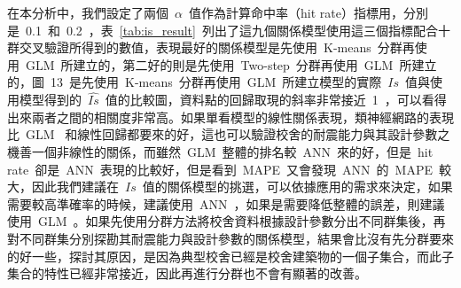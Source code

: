 



在本分析中，我們設定了兩個~$\alpha$~值作為計算命中率（hit rate）指標用，分別是~0.1~和~0.2~，表~\ref{tab:is_result}~列出了這九個關係模型使用這三個指標配合十群交叉驗證所得到的數值，表現最好的關係模型是先使用~K-means~分群再使用~GLM~所建立的，第二好的則是先使用~Two-step~分群再使用~GLM~所建立的，圖~13~是先使用~K-means~分群再使用~GLM~所建立模型的實際~$Is$~值與使用模型得到的~$\hat{Is}$~值的比較圖，資料點的回歸取現的斜率非常接近~1~，可以看得出來兩者之間的相關度非常高。如果單看模型的線性關係表現，類神經網路的表現比~GLM~ 和線性回歸都要來的好，這也可以驗證校舍的耐震能力與其設計參數之機善一個非線性的關係，而雖然~GLM~整體的排名較~ANN~來的好，但是~hit rate~卻是~ANN~表現的比較好，但是看到~MAPE~又會發現~ANN~的~MAPE~較大，因此我們建議在~$Is$~值的關係模型的挑選，可以依據應用的需求來決定，如果需要較高準確率的時候，建議使用~ANN~，如果是需要降低整體的誤差，則建議使用~GLM~。如果先使用分群方法將校舍資料根據設計參數分出不同群集後，再對不同群集分別探勘其耐震能力與設計參數的關係模型，結果會比沒有先分群要來的好一些，探討其原因，是因為典型校舍已經是校舍建築物的一個子集合，而此子集合的特性已經非常接近，因此再進行分群也不會有顯著的改善。


